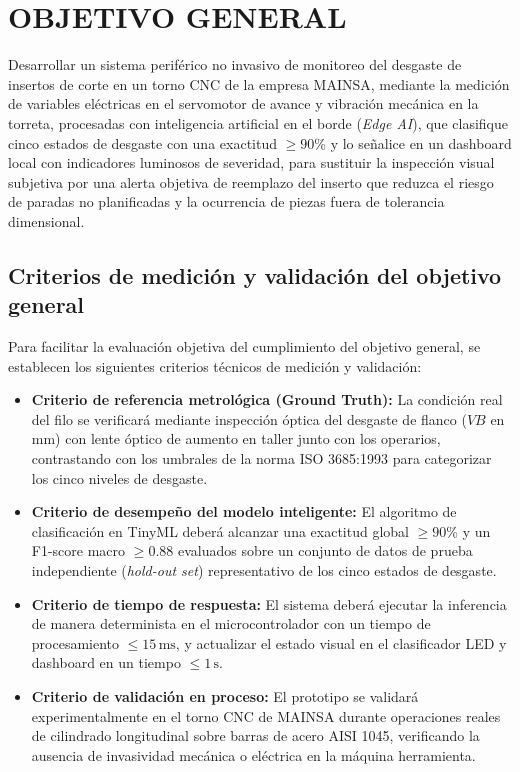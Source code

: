 \newpage
\section{OBJETIVO GENERAL}

Desarrollar un sistema periférico no invasivo de monitoreo del desgaste de insertos de corte en un torno CNC de la empresa MAINSA, mediante la medición de variables eléctricas en el servomotor de avance y vibración mecánica en la torreta, procesadas con inteligencia artificial en el borde (\textit{Edge AI}), que clasifique cinco estados de desgaste con una exactitud $\ge 90$\% y lo señalice en un dashboard local con indicadores luminosos de severidad, para sustituir la inspección visual subjetiva por una alerta objetiva de reemplazo del inserto que reduzca el riesgo de paradas no planificadas y la ocurrencia de piezas fuera de tolerancia dimensional.

\subsection{Criterios de medición y validación del objetivo general}
Para facilitar la evaluación objetiva del cumplimiento del objetivo general, se establecen los siguientes criterios técnicos de medición y validación:
\begin{itemize}
    \item \textbf{Criterio de referencia metrológica (Ground Truth):} La condición real del filo se verificará mediante inspección óptica del desgaste de flanco ($VB$ en mm) con lente óptico de aumento en taller junto con los operarios, contrastando con los umbrales de la norma ISO 3685:1993 para categorizar los cinco niveles de desgaste.
    \item \textbf{Criterio de desempeño del modelo inteligente:} El algoritmo de clasificación en TinyML deberá alcanzar una exactitud global $\ge 90$\% y un F1-score macro $\ge 0.88$ evaluados sobre un conjunto de datos de prueba independiente (\textit{hold-out set}) representativo de los cinco estados de desgaste.
    \item \textbf{Criterio de tiempo de respuesta:} El sistema deberá ejecutar la inferencia de manera determinista en el microcontrolador con un tiempo de procesamiento $\le 15\,\text{ms}$, y actualizar el estado visual en el clasificador LED y dashboard en un tiempo $\le 1\,\text{s}$.
    \item \textbf{Criterio de validación en proceso:} El prototipo se validará experimentalmente en el torno CNC de MAINSA durante operaciones reales de cilindrado longitudinal sobre barras de acero AISI 1045, verificando la ausencia de invasividad mecánica o eléctrica en la máquina herramienta.
\end{itemize}
